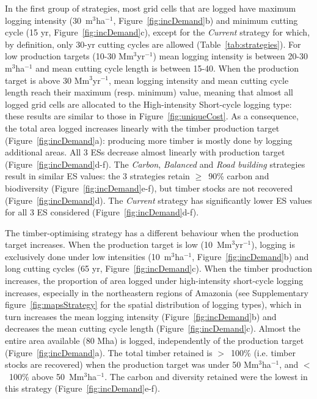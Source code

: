 \documentclass{article}
\begin{document}
In the first group of strategies, most grid cells that are logged have maximum logging intensity (30~m$^3$ha$^{-1}$, Figure~\ref{fig:incDemand}b) and minimum cutting cycle (15 yr, Figure~\ref{fig:incDemand}c), except for the \textit{Current} strategy for which, by definition, only 30-yr cutting cycles are allowed (Table~\ref{tab:strategies}). For low production targets (10-30 Mm$^3$yr$^{-1}$) mean logging intensity is between 20-30 m$^3$ha$^{-1}$ and mean cutting cycle length is between 15-40. When the production target is above 30 Mm$^3$yr$^{-1}$, mean logging intensity and mean cutting cycle length reach their maximum (resp. minimum) value, meaning that almost all logged grid cells are allocated to the High-intensity Short-cycle logging type: these results are similar to those in Figure~\ref{fig:uniqueCost}. As a consequence, the total area logged increases linearly with the timber production target (Figure~\ref{fig:incDemand}a): producing more timber is mostly done by logging additional areas. All 3 ESs decrease almost linearly with production target (Figure~\ref{fig:incDemand}d-f). The \textit{Carbon}, \textit{Balanced} and \textit{Road building} strategies result in similar ES values: the 3 strategies retain $\geq$~90\% carbon and biodiversity (Figure~\ref{fig:incDemand}e-f), but timber stocks are not recovered  (Figure~\ref{fig:incDemand}d). The \textit{Current} strategy has significantly lower ES values for all 3 ES considered (Figure~\ref{fig:incDemand}d-f).

The timber-optimising strategy has a different behaviour when the production target increases. When the production target is low (10~Mm$^3$yr$^{-1}$), logging is exclusively done under low intensities (10~m$^3$ha$^{-1}$, Figure~\ref{fig:incDemand}b) and long cutting cycles (65 yr, Figure~\ref{fig:incDemand}c). When the timber production increases, the proportion of area logged under high-intensity short-cycle logging increases, especially in the northeastern regions of Amazonia (see Supplementary figure~\ref{fig:mapsStrategy} for the spatial distribution of logging types), which in turn increases the mean logging intensity (Figure~\ref{fig:incDemand}b) and decreases the mean cutting cycle length (Figure~\ref{fig:incDemand}c). Almost the entire area available (80 Mha) is logged, independently of the production target (Figure~\ref{fig:incDemand}a). The total timber retained is $>$~100\% (i.e. timber stocks are recovered) when the production target was under 50 Mm$^3$ha$^{-1}$, and $<$~100\% above 50~Mm$^3$ha$^{-1}$. The carbon and diversity retained were the lowest in this strategy (Figure~\ref{fig:incDemand}e-f).  
\end{document}

